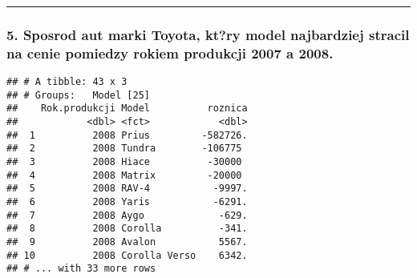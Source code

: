 \documentclass[]{article}
\newenvironment{Shaded}{\begin{snugshade}}{\end{snugshade}}
\newcommand{\KeywordTok}[1]{\textcolor[rgb]{0.13,0.29,0.53}{\textbf{#1}}}
\newcommand{\DataTypeTok}[1]{\textcolor[rgb]{0.13,0.29,0.53}{#1}}
\newcommand{\DecValTok}[1]{\textcolor[rgb]{0.00,0.00,0.81}{#1}}
\newcommand{\StringTok}[1]{\textcolor[rgb]{0.31,0.60,0.02}{#1}}
\newcommand{\OperatorTok}[1]{\textcolor[rgb]{0.81,0.36,0.00}{\textbf{#1}}}
\newcommand{\NormalTok}[1]{#1}
\begin{document}
\begin{center}\rule{0.5\linewidth}{\linethickness}\end{center}

\subsubsection{5. Sposrod aut marki Toyota, kt?ry model najbardziej
stracil na cenie pomiedzy rokiem produkcji 2007 a
2008.}\label{sposrod-aut-marki-toyota-ktry-model-najbardziej-stracil-na-cenie-pomiedzy-rokiem-produkcji-2007-a-2008.}

\begin{Shaded}
\end{Shaded}

\begin{verbatim}
## # A tibble: 43 x 3
## # Groups:   Model [25]
##    Rok.produkcji Model          roznica
##            <dbl> <fct>            <dbl>
##  1          2008 Prius         -582726.
##  2          2008 Tundra        -106775 
##  3          2008 Hiace          -30000 
##  4          2008 Matrix         -20000 
##  5          2008 RAV-4           -9997.
##  6          2008 Yaris           -6291.
##  7          2008 Aygo             -629.
##  8          2008 Corolla          -341.
##  9          2008 Avalon           5567.
## 10          2008 Corolla Verso    6342.
## # ... with 33 more rows
\end{verbatim}
\end{document}
